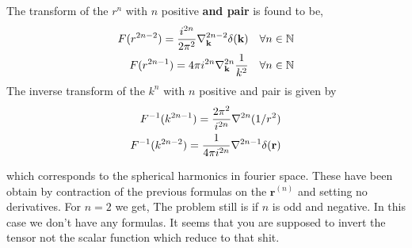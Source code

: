 The transform of the $r^n$ with $n$ positive \textbf{and pair} is found to be,
\begin{align}
    F(r^{2n-2})
    =\frac{i^{2n}}{2\pi^2}
    \mathbf{\nabla}_\textbf{k}^{2n-2} \delta(\textbf{k})
    && \forall n\in \mathbb{N} \\
    F(r^{2n-1})
    =4\pi i^{2n}
    \mathbf{\nabla}_\textbf{k}^{2n} \frac{1}{k^2}
    &&  \forall n\in \mathbb{N}\\
\end{align}
The inverse transform of the $k^n$ with $n$ positive and pair is given by
\begin{align*}
    F^{-1}(k^{2n-1} )
    =
    \frac{2\pi^2}{i^{2n}}\mathbf{\nabla}^{2n}(1/r^2)\\
    F^{-1}(k^{2n-2})
    =
    \frac{1}{4\pi i^{2n}}\mathbf{\nabla}^{2n-1}\delta(\textbf{r})
\end{align*}


which corresponds to the spherical harmonics in fourier space.
These have been obtain by contraction of the previous formulas on the $\textbf{r}^{(n)}$ and setting no derivatives.
For $n =2$ we get,
The problem still is if $n$ is odd and negative. In this case we don't have any formulas.
It seems that you are supposed to invert the tensor not the scalar function which reduce to that shit.


